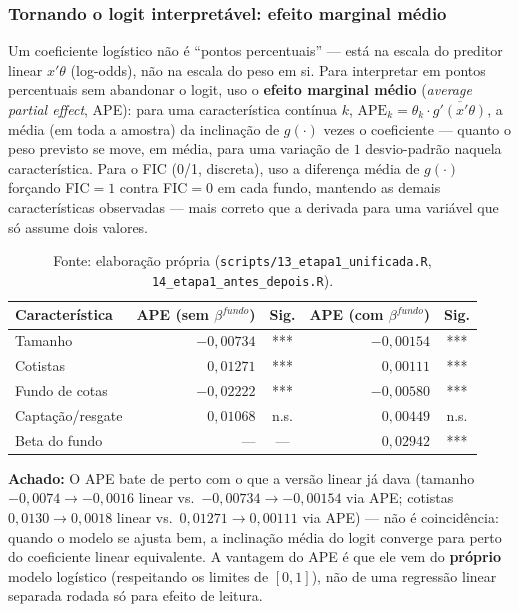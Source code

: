 \documentclass[11pt,a4paper]{article}
\newcommand{\aha}[1]{\par\vspace{4pt}\noindent\textbf{\color{vermelho}Achado:} #1\par\vspace{2pt}}
\begin{document}
\subsubsection*{Tornando o logit interpretável: efeito marginal médio}

Um coeficiente logístico não é ``pontos percentuais'' --- está na escala do preditor linear
$x'\theta$ (log-odds), não na escala do peso em si. Para interpretar em pontos percentuais sem
abandonar o logit, uso o \textbf{efeito marginal médio} (\emph{average partial effect}, APE):
para uma característica contínua $k$, $\text{APE}_k=\theta_k\cdot\overline{g'(x'\theta)}$, a média
(em toda a amostra) da inclinação de $g(\cdot)$ vezes o coeficiente --- quanto o peso previsto se
move, em média, para uma variação de $1$ desvio-padrão naquela característica. Para o FIC (0/1,
discreta), uso a diferença média de $g(\cdot)$ forçando FIC$=1$ contra FIC$=0$ em cada fundo,
mantendo as demais características observadas --- mais correto que a derivada para uma variável
que só assume dois valores.

\begin{table}[h]\centering\small
\caption{Efeito marginal médio (APE) do logit, em pontos percentuais de peso --- mesma
comparação sem/com beta do fundo.}
\begin{tabular}{@{}lrcrc@{}}
\toprule
Característica & APE (sem $\beta^{fundo}$) & Sig. & APE (com $\beta^{fundo}$) & Sig. \\
\midrule
Tamanho              & $-0{,}00734$ & *** & $-0{,}00154$ & *** \\
Cotistas             & $0{,}01271$  & *** & $0{,}00111$  & *** \\
Fundo de cotas       & $-0{,}02222$ & *** & $-0{,}00580$ & *** \\
Captação/resgate     & $0{,}01068$  & n.s. & $0{,}00449$ & n.s. \\
Beta do fundo        & ---           & --- & $0{,}02942$  & *** \\
\bottomrule
\end{tabular}
\caption*{\footnotesize Fonte: elaboração própria (\texttt{scripts/13\_etapa1\_unificada.R},
\texttt{14\_etapa1\_antes\_depois.R}).}
\end{table}

\aha{O APE bate de perto com o que a versão linear já dava (tamanho $-0{,}0074\to-0{,}0016$
linear vs.\ $-0{,}00734\to-0{,}00154$ via APE; cotistas $0{,}0130\to0{,}0018$ linear vs.\
$0{,}01271\to0{,}00111$ via APE) --- não é coincidência: quando o modelo se ajusta bem, a
inclinação média do logit converge para perto do coeficiente linear equivalente. A vantagem do
APE é que ele vem do \textbf{próprio} modelo logístico (respeitando os limites de $[0,1]$), não
de uma regressão linear separada rodada só para efeito de leitura.}
\end{document}
